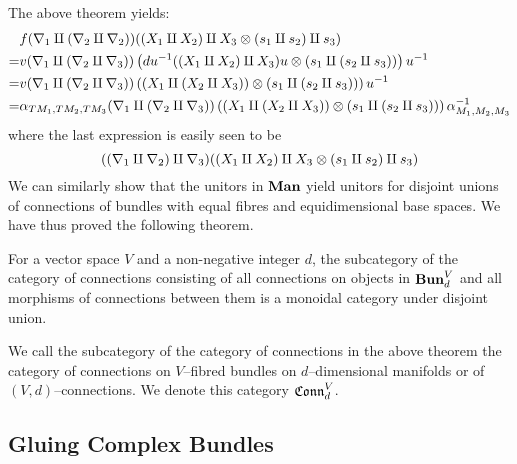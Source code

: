 \documentclass[./Thick_TQFTs_and_Quantum_Information.tex]{subfiles}
\begin{document}
The above theorem yields:
\begin{align*}
  & f(\nabla_1 \amalg (\nabla_2 \amalg \nabla_2))(
      (X_1 \amalg X_2) \amalg X_3
      \otimes (s_1 \amalg s_2) \amalg s_3
      ) \\
  =& v(\nabla_1 \amalg (\nabla_2 \amalg \nabla_3))\left( 
    du^{-1}((X_1 \amalg X_2) \amalg X_3)u
    \otimes (s_1 \amalg (s_2 \amalg s_3))
   \right)u^{-1}\\
  =& v(\nabla_1 \amalg (\nabla_2 \amalg \nabla_3))\left( 
    (X_1 \amalg (X_2 \amalg X_3))
    \otimes (s_1 \amalg (s_2 \amalg s_3))
   \right)u^{-1} \\
  =& \alpha_{TM_1, TM_2, TM_3}(\nabla_1 \amalg (\nabla_2 \amalg \nabla_3))\left( 
    (X_1 \amalg (X_2 \amalg X_3))
    \otimes (s_1 \amalg (s_2 \amalg s_3))
   \right)\alpha_{M_1, M_2, M_3}^{-1}
\end{align*}
where the last expression is easily seen to be
\[
  ((\nabla_1 \amalg \nabla_2) \amalg \nabla_3)(
    (X_1 \amalg X_2) \amalg X_3 \otimes (s_1 \amalg s_2) \amalg s_3
  )
\]
We can similarly show that the unitors in $\textbf{Man}$ yield unitors for disjoint
unions of connections of bundles with equal fibres and equidimensional base
spaces. We have thus proved the following theorem.
\begin{thm}\label{thm:bundle_gluing}
For a vector space $V$ and a non-negative integer $d$, the subcategory of the
category of connections consisting of all connections on objects in
$\textbf{Bun}_d^{V}$ and all morphisms of connections between them is a monoidal
category under disjoint union.
\end{thm}
\begin{defn}
We call the subcategory of the category of connections in the above theorem the
category of connections on $V$--fibred bundles on $d$--dimensional manifolds or
of $(V, d)$--connections. We denote this category $\mathfrak{Conn}^V_d$.
\end{defn}


\subsection{Gluing Complex Bundles}
\end{document}
